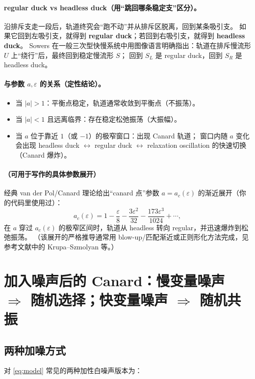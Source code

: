 \documentclass[a4paper,twoside,openany,UTF8]{article}  %
\numberwithin{equation}{section}  %
\numberwithin{equation}{section}  %
\begin{document}
\paragraph{regular duck vs headless duck（用“跳回哪条稳定支”区分）。}
沿排斥支走一段后，轨道终究会“跑不动”并从排斥区脱离，回到某条吸引支。
如果它回到左吸引支，就得到 \textbf{regular duck}；若回到右吸引支，就得到 \textbf{headless duck}。
Sowers 在一般三次型快慢系统中用图像语言明确指出：轨道在排斥慢流形 $U$ 上“绕行”后，最终回到稳定慢流形 $S$；
回到 $S_L$ 是 regular duck，回到 $S_R$ 是 headless duck。%

\paragraph{与参数 $a,\varepsilon$ 的关系（定性结论）。}
\begin{itemize}
	\item 当 $|a|>1$：平衡点稳定，轨道通常收敛到平衡点（不振荡）。
	\item 当 $|a|<1$ 且远离临界：存在稳定松弛振荡（大振幅）。
	\item 当 $a$ 位于靠近 $1$（或 $-1$）的极窄窗口：出现 Canard 轨道；
	窗口内随 $a$ 变化会出现 headless duck $\leftrightarrow$ regular duck $\leftrightarrow$ relaxation oscillation 的快速切换（Canard 爆炸）。
\end{itemize}

\paragraph{（可用于写作的具体参数展开）}
经典 van der Pol/Canard 理论给出“canard 点”参数 $a=a_c(\varepsilon)$ 的渐近展开（你的代码里使用过）：
\[
a_c(\varepsilon)=1-\frac{\varepsilon}{8}-\frac{3\varepsilon^2}{32}-\frac{173\varepsilon^3}{1024}+\cdots,
\]
在 $a$ 穿过 $a_c(\varepsilon)$ 的极窄区间时，轨道从 headless 转向 regular，并迅速爆炸到松弛振荡。
（该展开的严格推导通常用 blow-up/匹配渐近或正则形化方法完成，见参考文献中的 Krupa--Szmolyan 等。）



\section{加入噪声后的 Canard：慢变量噪声 $\Rightarrow$ 随机选择；快变量噪声 $\Rightarrow$ 随机共振}

\subsection{两种加噪方式}
对 \eqref{eq:model} 常见的两种加性白噪声版本为：
\end{document}
